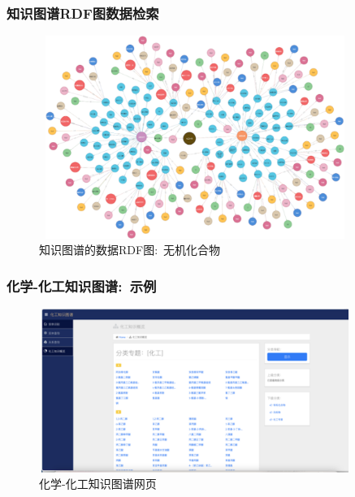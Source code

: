 \begin{frame}
	\frametitle{知识图谱\textrm{RDF}图数据检索}
\begin{figure}[h!]
\centering
\includegraphics[height=2.60in,width=4.00in,viewport=0 0 240 180,clip]{Figures/KG_Chem-Inorganic.png}
\caption{\tiny 知识图谱的数据\textrm{RDF}图:~无机化合物}%
\label{Fig:KG_Chem-Inorganic}
\end{figure}
\end{frame}

\begin{frame}
	\frametitle{化学-化工知识图谱:~示例}
\begin{figure}[h!]
\centering
\includegraphics[height=2.10in,width=4.00in,viewport=0 0 240 130,clip]{Figures/KG_Chem-html.png}
\caption{\tiny 化学-化工知识图谱网页}%
\label{Fig:KG_Chem-Enflurane}
\end{figure}
\end{frame}


